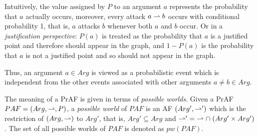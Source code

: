 



Intuitively, 
the value assigned by $P$ to an argument $a$ represents the probability that $a$ actually occurs, 
moreover, 
every attack $a \rightharpoonup b$ occurs with conditional probability 1, 
that is, 
$a$ attacks $b$ whenever both $a$ and $b$ occur.
% 
Or in a \textit{justification perspective}:
$P(a)$ is treated as the probability that $a$ is a justified point and therefore should appear in the graph, 
and $1-P(a)$ is the probability that $a$ is not a justified point and so should not appear in the graph.

Thus, 
an argument $a \in Arg$ is viewed as a probabilistic event which is independent from the other events associated with other arguments 
$a \not=b \in Arg$.

\vspace{1.5em}






The meaning of a PrAF is given in terms of \textit{possible worlds}. 
Given a PrAF $PAF=(Arg,\rightharpoonup,P)$, 
a \textit{possible world} of $PAF$ is an AF $(Arg',\rightharpoonup')$ which is the restriction of $(Arg,\rightharpoonup)$ to $Arg'$, 
that is, 
$Arg' \subseteq Arg$ and $\rightharpoonup' \;=\; \rightharpoonup \cap\; (Arg'\times Arg')$. 
% 
The set of all possible worlds of $PAF$ is denoted as {\color{purple} $pw(PAF)$}.








